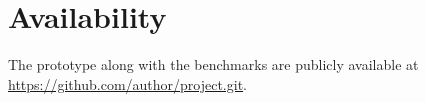 \section*{Availability}

The prototype along with the benchmarks
are publicly available at \url{https://github.com/author/project.git}.